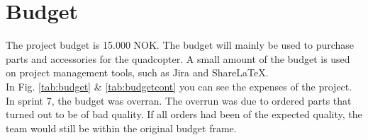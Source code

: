 \clearpage

\chapter{Budget}
The project budget is 15.000 NOK. The budget will mainly be used to purchase parts and accessories for the quadcopter. A small amount of the budget is used on project management tools, such as Jira and ShareLaTeX.\\

In Fig. \ref{tab:budget} \& \ref{tab:budgetcont} you can see the expenses of the project. In sprint 7, the budget was overran. The overrun was due to ordered parts that turned out to be of bad quality. If all orders had been of the expected quality, the team would still be within the original budget frame. 


